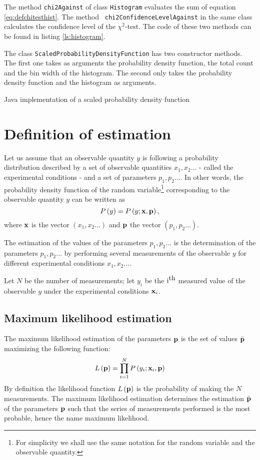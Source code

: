\documentclass[twoside]{book}
\begin{document}
The method {\tt chi2Against} of class {\tt Histogram} evaluates
the sum of equation \ref{eq:defchitesthist}. The method {\tt
chi2ConfidenceLevelAgainst} in the same class calculates the
confidence level of the $\chi^2$-test. The code of these two
methods can be found in listing \ref{ls:histogram}.

The class {\tt ScaledProbabilityDensityFunction} has two
constructor methods. The first one takes as arguments the
probability density function, the total count and the bin width of
the histogram. The second only takes the probability density
function and the histogram as arguments.

\begin{listing} Java implementation of a scaled
probability density function \label{lj:scaleddist}

\end{listing}

\section{Definition of estimation}
Let us assume that an observable quantity $y$ is following a
probability distribution described by a set of observable
quantities $x_1,x_2\ldots$ - called the experimental conditions -
and a set of parameters $p_1,p_2\ldots$. In other words, the
probability density function of the random variable\footnote{For
simplicity we shall use the same notation for the random variable
and the observable quantity.} corresponding to the observable
quantity $y$ can be written as
\begin{equation}
\label{eq:estimprob}
  P\left(y\right)=P\left(y;{\bf x},{\bf p}\right),
\end{equation}
where ${\bf x}$ is the vector $\left(x_1,x_2\ldots\right)$ and
${\bf p}$ the vector $\left(p_1,p_2\ldots\right)$.

The estimation of the values of the parameters $p_1,p_2\ldots$ is
the determination of the parameters $p_1,p_2\ldots$ by performing
several measurements of the observable $y$ for different
experimental conditions $x_1,x_2\ldots$.

Let $N$ be the number of measurements; let $y_i$ be the $\mbox{\rm
i}^{\mbox{\rm th}}$ measured value of the observable $y$ under the
experimental conditions ${\bf x}_i$.

\subsection{Maximum likelihood estimation}
\label{sec:mlf} The maximum likelihood estimation of the
parameters ${\bf p}$ is the set of values $\bar{\bf p}$ maximizing
the following function:
\begin{equation}
\label{eq:maxlike}
  L\left({\bf p}\right)=\prod_{i=1}^N P\left(y_i;{\bf x}_i,{\bf p}\right)
\end{equation}
By definition the likelihood function $L\left({\bf p}\right)$ is
the probability of making the $N$ measurements. The maximum
likelihood estimation determines the estimation $\bar{\bf p}$ of
the parameters ${\bf p}$ such that the series of measurements
performed is the most probable, hence the name maximum likelihood.
\end{document}
